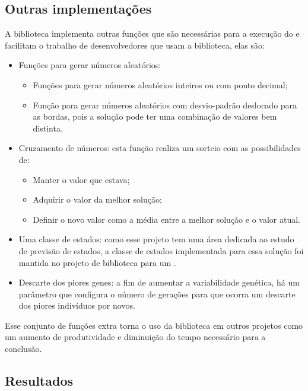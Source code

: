 \subsection{Outras implementações}

A biblioteca implementa outras funções que são necessárias para a execução do \SE e facilitam o trabalho de desenvolvedores que usam a biblioteca, elas são:

\begin{itemize}
    \item Funções para gerar números aleatórios:
        \begin{itemize}
            \item Funções para gerar números aleatórios inteiros ou com ponto decimal;
            \item Função para gerar números aleatórios com desvio-padrão deslocado para as bordas, pois a solução pode ter uma combinação de valores bem distinta.
        \end{itemize}
    \item Cruzamento de números: esta função realiza um sorteio com as possibilidades de:
        \begin{itemize}
            \item Manter o valor que estava;
            \item Adquirir o valor da melhor solução;
            \item Definir o novo valor como a média entre a melhor solução e o valor atual.
        \end{itemize}
    \item Uma classe de estados: como esse projeto tem uma área dedicada ao estudo de previsão de estados, a classe de estados implementada para essa solução foi mantida no projeto de biblioteca para um \SE.
    \item Descarte dos piores genes: a fim de aumentar a variabilidade genética, há um parâmetro que configura o número de gerações para que ocorra um descarte dos piores indivíduos por novos.
\end{itemize}

Esse conjunto de funções extra torna o uso da biblioteca em outros projetos como um aumento de produtividade e diminuição do tempo necessário para a conclusão.

\subsection{Resultados}

